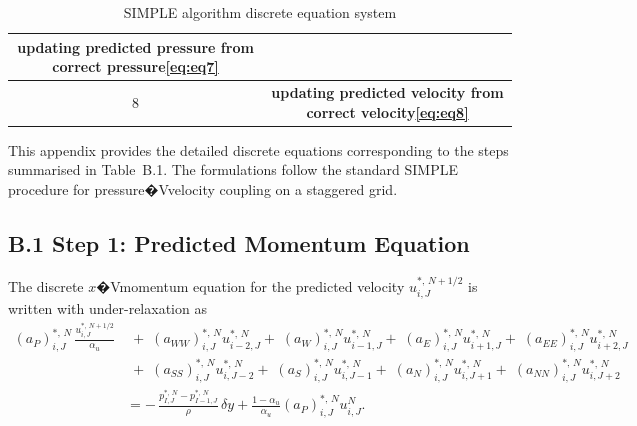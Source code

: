 \documentclass[12pt]{article}
\theoremstyle{plain}  %
\theoremstyle{definition}  %
\renewcommand{\thesection}{\arabic{section}}
\renewcommand{\theequation}{\thesection.\arabic{equation}}
\begin{document}
\begin{table}[H]
\begin{tabular}{|c|c|}
\begin{minipage}[c]{0.85\textwidth}
\centering
\vspace{0.3em}
\textbf{updating predicted pressure from correct pressure\eqref{eq:eq7}}
\vspace{0.3em}
\end{minipage} \\
\hline
8 & 
\begin{minipage}[c]{0.85\textwidth}
\centering
\vspace{0.3em}
\textbf{updating predicted velocity from correct velocity\eqref{eq:eq8}}
\vspace{0.3em}
\end{minipage} \\
\hline
\end{tabular}
\caption{SIMPLE algorithm discrete equation system}
\label{tab:SIMPLE_equations}
\end{table}


This appendix provides the detailed discrete equations corresponding to the
steps summarised in Table~B.1. The formulations follow the standard
SIMPLE procedure for pressure�Vvelocity coupling on a staggered grid.

\renewcommand\theequation{B.\arabic{equation}}
\setcounter{equation}{0}

\subsection*{B.1 \quad Step 1: Predicted Momentum Equation}

The discrete $x$�Vmomentum equation for the predicted velocity
$u_{i,J}^{*,\,N+1/2}$ is written with under-relaxation as
\begin{equation}
\begin{aligned}
(a_P)_{i,J}^{*,\,N}\,\frac{u_{i,J}^{*,\,N+1/2}}{\alpha_u}
&\;+\;(a_{WW})_{i,J}^{*,\,N} u_{i-2,J}^{*,\,N}
+\;(a_W)_{i,J}^{*,\,N}   u_{i-1,J}^{*,\,N}
+\;(a_E)_{i,J}^{*,\,N}   u_{i+1,J}^{*,\,N}
+\;(a_{EE})_{i,J}^{*,\,N} u_{i+2,J}^{*,\,N} \\
&\;+\;(a_{SS})_{i,J}^{*,\,N} u_{i,J-2}^{*,\,N}
+\;(a_S)_{i,J}^{*,\,N}   u_{i,J-1}^{*,\,N}
+\;(a_N)_{i,J}^{*,\,N}   u_{i,J+1}^{*,\,N}
+\;(a_{NN})_{i,J}^{*,\,N} u_{i,J+2}^{*,\,N}
\\[3pt]
&= -\,\frac{ p_{I,J}^{*,\,N} - p_{I-1,J}^{*,\,N} }{\rho}\,\delta y
+ \frac{1-\alpha_u}{\alpha_u}(a_P)_{i,J}^{*,\,N}u_{i,J}^{N}.
\end{aligned}
\label{eq:eq1}
\end{equation}
\end{document}
